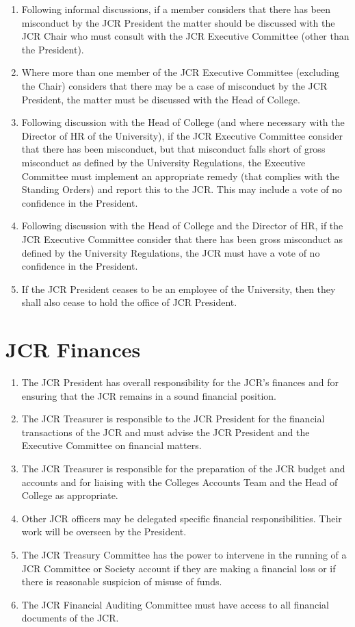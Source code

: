 \documentclass[12pt]{article}  %
\begin{document}
\begin{enumerate}
    \item Following informal discussions, if a member considers that there has been misconduct by the JCR President the matter should be discussed with the JCR Chair who must consult with the JCR Executive Committee (other than the President).
    \item Where more than one member of the JCR Executive Committee (excluding the Chair) considers that there may be a case of misconduct by the JCR President, the matter must be discussed with the Head of College.
    \item Following discussion with the Head of College (and where necessary with the Director of HR of the University), if the JCR Executive Committee consider that there has been misconduct, but that misconduct falls short of gross misconduct as defined by the University Regulations, the Executive Committee must implement an appropriate remedy (that complies with the Standing Orders) and report this to the JCR. This may include a vote of no confidence in the President.
    \item Following discussion with the Head of College and the Director of HR, if the JCR Executive Committee consider that there has been gross misconduct as defined by the University Regulations, the JCR must have a vote of no confidence in the President.
    \item If the JCR President ceases to be an employee of the University, then they shall also cease to hold the office of JCR President.
\end{enumerate}
\newpage

\section{JCR Finances}
\begin{enumerate}
    \item The JCR President has overall responsibility for the JCR’s finances and for ensuring that the JCR remains in a sound financial position.
    \item The JCR Treasurer is responsible to the JCR President for the financial transactions of the JCR and must advise the JCR President and the Executive Committee on financial matters.
    \item The JCR Treasurer is responsible for the preparation of the JCR budget and accounts and for liaising with the Colleges Accounts Team and the Head of College as appropriate.
    \item Other JCR officers may be delegated specific financial responsibilities. Their work will be overseen by the President.
    \item The JCR Treasury Committee has the power to intervene in the running of a JCR Committee or Society account if they are making a financial loss or if there is reasonable suspicion of misuse of funds.
    \item The JCR Financial Auditing Committee must have access to all financial documents of the JCR.
\end{enumerate}
\newpage
\end{document}
